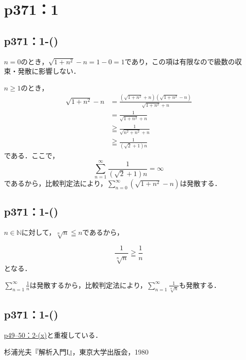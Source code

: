 \documentclass[a4paper,10pt,fleqn]{ltjsarticle}
\begin{document}
\newpage

\section*{p371：1}


\subsection*{p371：1-()}

\begin{tleftbar}
    $n =0$のとき，$\sqrt{1+n^2}-n =1-0= 1$であり，この項は有限なので級数の収束・発散に影響しない．

    $n \geq 1$のとき，
    \begin{align*}
        \sqrt{1+n^2}-n & = \frac{(\sqrt{1+n^2}+n)(\sqrt{1+n^2}-n)}{\sqrt{1+n^2}+n} \\
                       & = \frac{1}{\sqrt{1+n^2}+n}                                \\
                       & \geqq \frac{1}{\sqrt{n^2+n^2}+n}                          \\
                       & \geqq \frac{1}{(\sqrt{2}+1)n}
    \end{align*}
    である．ここで，
    \[
        \sum_{n=1}^{\infty} \frac{1}{(\sqrt{2}+1)n} =\infty
    \]
    であるから，比較判定法により，$ \sum_{n=0}^{\infty} ( \sqrt{1+n^2}-n )$は発散する．
\end{tleftbar}


\subsection*{p371：1-()}

\begin{tleftbar}
    $n \in \mathbb{N}$に対して，$ \sqrt[n]{n} \leqq n$であるから，

    \[
        \frac{1}{\sqrt[n]{n}} \geqq \frac{1}{n}
    \]
    となる．

    $ \sum_{n=1}^{\infty} \frac{1}{n}$は発散するから，比較判定法により，$ \sum_{n=1}^{\infty} \frac{1}{\sqrt[n]{n}}$も発散する．
\end{tleftbar}


\subsection*{p371：1-()}

\hyperref[p49--50：2-(x)]{p49--50：2-(x)}と重複している．

\newpage


\begin{thebibliography}{9}
     杉浦光夫『解析入門I』，東京大学出版会，1980
\end{thebibliography}
\end{document}
